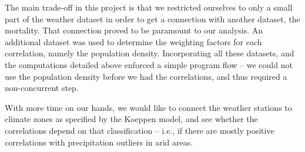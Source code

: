 \documentclass[
10pt, %
a4paper, %
oneside, %
headinclude,footinclude, %
useAMS,
usenatbib
]{mn2e}  %
\begin{document}
The main trade-off in this project is that we restricted ourselves to only a small part of the  weather dataset in order to get a connection with another dataset, the mortality. That connection proved to be paramount to our analysis. An additional dataset was used to determine the weighting factors for each correlation, namely the population density. Incorporating all these datasets, and the computations detailed above enforced a simple program flow -- we could not use the population density before we had the correlations, and thus required a non-concurrent step.

With more time on our hands, we would like to connect the weather stations to climate zones as specified by the Koeppen model, and see whether the correlations depend on that classification -- i.e., if there are mostly positive correlations with precipitation outliers in arid areas.

%
%
\end{document}
